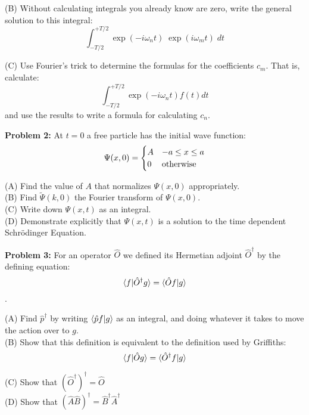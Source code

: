 \documentclass[12pt]{article}
\begin{document}
\noindent
(B) Without calculating integrals you already know are zero, write the general solution to this integral:
$$ \int_{-T/2}^{+T/2} \exp(-i \omega_n t) \; \exp(i \omega_m t)  \; dt $$

\noindent
(C) Use Fourier's trick to determine the formulas for the coefficients $c_m$.  That is, calculate:
$$ \int_{-T/2}^{+T/2} \exp(-i \omega_n t) f(t) dt $$
and use the results to write a formula for calculating $c_n$.

\newpage

\noindent
{\bf Problem 2:} At $t=0$ a free particle has the initial wave function:
$$ \Psi(x,0) = 
\begin{cases}    
A & -a \leq x \leq a \\
0 & {\rm otherwise} \\
\end{cases} 
$$

\noindent
(A) Find the value of $A$ that normalizes $\Psi(x,0)$ appropriately.\\

\noindent
(B) Find $\widetilde{\Psi}(k,0)$ the Fourier transform of $\Psi(x,0)$.\\

\noindent
(C) Write down $\Psi(x,t)$ as an integral.\\

\noindent
(D) Demonstrate explicitly that $\Psi(x,t)$ is a solution to the time dependent Schr\"odinger Equation.\\

\vskip 2cm

\noindent
{\bf Problem 3:} For an operator $\hat{O}$ we defined its Hermetian adjoint $\hat{O}^\dagger$ by the defining equation:
$$\braket{f|\hat{O}^\dagger g} = \braket{\hat{O} f | g}$$.

\noindent
(A) Find $\hat{p}^\dagger$ by writing $\braket{\hat{p} f | g}$ as an integral, and doing whatever it takes to move the action over to $g$.\\[5pt]

\noindent
(B) Show that this definition is equivalent to the definition used by Griffiths:
$$\braket{f|\hat{O} g} = \braket{\hat{O}^\dagger f | g}$$

\noindent
(C) Show that $\left(\hat{O}^\dagger\right)^\dagger = \hat{O}$\\[5pt]

\noindent
(D) Show that $\left(\hat{A}\hat{B}\right)^\dagger = \hat{B}^\dagger\hat{A}^\dagger$\\[5pt]
\end{document}
